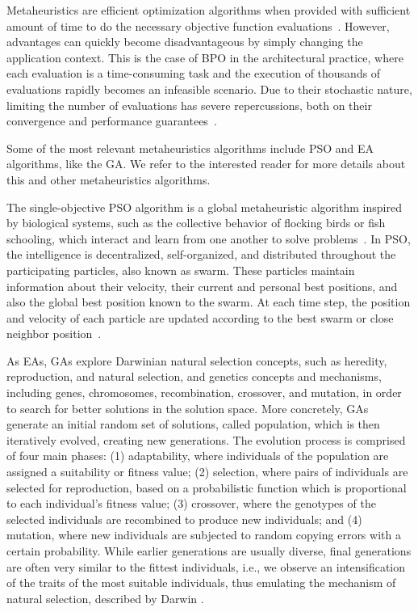 	Metaheuristics are efficient optimization algorithms when provided with sufficient amount of time to do the necessary objective function evaluations~\cite{Conn2009}. However, advantages can quickly become disadvantageous by simply changing the application context. This is the case of \ac{BPO} in the architectural practice, where each evaluation is a time-consuming task and the execution of thousands of evaluations rapidly becomes an infeasible scenario. Due to their stochastic nature, limiting the number of evaluations has severe repercussions, both on their convergence and performance guarantees~\cite{Hasancebi2009}. 
	
	Some of the most relevant metaheuristics algorithms include \ac{PSO} and \ac{EA} algorithms, like the \ac{GA}. We refer  to the interested reader for more details about this and other metaheuristics algorithms.
	
	The single-objective \ac{PSO} algorithm is a global metaheuristic algorithm inspired by biological systems, such as the collective behavior of flocking birds or fish schooling, which interact and learn from one another to solve problems~\cite{Brownlee2011}. In \ac{PSO}, the intelligence is decentralized, self-organized, and distributed throughout the participating particles, also known as swarm. These particles maintain information about their velocity, their current and personal best positions, and also the global best position known to the swarm. At each time step, the position and velocity of each particle are updated according to the best swarm or close neighbor position~\cite{Brownlee2011}.
	
	As \acp{EA}, \acp{GA} explore Darwinian natural selection concepts, such as heredity, reproduction, and natural selection, and genetics concepts and mechanisms, including genes, chromosomes, recombination, crossover, and mutation, in order to search for better solutions in the solution space. More concretely, \acp{GA} generate an initial random set of solutions, called population, which is then iteratively evolved, creating new generations. The evolution process is comprised of four main phases: (1) adaptability, where individuals of the population are assigned a suitability or fitness value; (2) selection, where pairs of individuals are selected for reproduction, based on a probabilistic function which is proportional to each individual's fitness value; (3) crossover, where the genotypes of the selected individuals are recombined to produce new individuals; and (4) mutation, where new individuals are subjected to random copying errors with a certain probability. While earlier generations are usually diverse, final generations are often very similar to the fittest individuals, i.e., we observe an intensification of the traits of the most suitable individuals, thus emulating the mechanism of natural selection, described by Darwin \cite{Brownlee2011}. %
	
